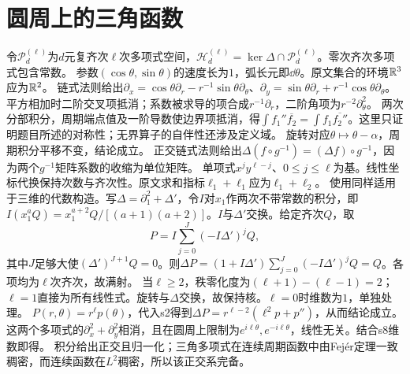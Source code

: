 \documentclass[UTF8,fontset=fandol,11pt]{ctexart}
\begin{document}
\section{圆周上的三角函数}
令$\mathcal P_d^{(\ell)}$为$d$元复齐次$\ell$次多项式空间，$\mathcal H_d^{(\ell)}=\ker\Delta\cap\mathcal P_d^{(\ell)}$。零次齐次多项式包含常数。
参数$(\cos\theta,\sin\theta)$的速度长为$1$，弧长元即$\dd\theta$。原文集合的环境$\mathbb R^3$应为$\mathbb R^2$。
链式法则给出$\partial_x=\cos\theta\partial_r-r^{-1}\sin\theta\partial_\theta$、$\partial_y=\sin\theta\partial_r+r^{-1}\cos\theta\partial_\theta$。平方相加时二阶交叉项抵消；系数被求导的项合成$r^{-1}\partial_r$，二阶角项为$r^{-2}\partial_\theta^2$。
两次分部积分，周期端点值及一阶导数使边界项抵消，得$\int f_1''\overline{f_2}=\int f_1\overline{f_2''}$。这里只证明题目所述的对称性；无界算子的自伴性还涉及定义域。
旋转对应$\theta\mapsto\theta-\alpha$，周期积分平移不变，结论成立。
正交链式法则给出$\Delta(f\circ g^{-1})=(\Delta f)\circ g^{-1}$，因为两个$g^{-1}$矩阵系数的收缩为单位矩阵。
单项式$x^jy^{\ell-j}$、$0\le j\le\ell$为基。线性坐标代换保持次数与齐次性。原文求和指标$\ell_1+\ell_1$应为$\ell_1+\ell_2$。
使用同样适用于三维的代数构造。写$\Delta=\partial_1^2+\Delta'$，令$I$对$x_1$作两次不带常数的积分，即$I(x_1^aQ)=x_1^{a+2}Q/[(a+1)(a+2)]$。$I$与$\Delta'$交换。给定齐次$Q$，取
\[P=I\sum_{j=0}^{J}(-I\Delta')^jQ,\]
其中$J$足够大使$(\Delta')^{J+1}Q=0$。则$\Delta P=(1+I\Delta')\sum_{j=0}^{J}(-I\Delta')^jQ=Q$。各项均为$\ell$次齐次，故满射。
当$\ell\ge2$，秩零化度为$(\ell+1)-(\ell-1)=2$；$\ell=1$直接为所有线性式。旋转与$\Delta$交换，故保持核。$\ell=0$时维数为$1$，单独处理。
$P(r,\theta)=r^\ell p(\theta)$，代入s2得到$\Delta P=r^{\ell-2}(\ell^2p+p'')$，从而结论成立。
这两个多项式的$\partial_x^2+\partial_y^2$相消，且在圆周上限制为$e^{i\ell\theta},e^{-i\ell\theta}$，线性无关。结合s8维数即得。
积分给出正交且归一化；三角多项式在连续周期函数中由Fejér定理一致稠密，而连续函数在$L^2$稠密，所以该正交系完备。
\end{document}
